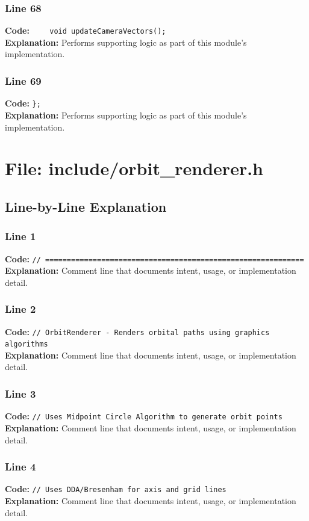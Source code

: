 \documentclass[11pt,a4paper]{article}
\begin{document}
\subsubsection*{Line 68}
\textbf{Code:} \verb|    void updateCameraVectors();|\\
\textbf{Explanation:} Performs supporting logic as part of this module's implementation.

\subsubsection*{Line 69}
\textbf{Code:} \verb|};|\\
\textbf{Explanation:} Performs supporting logic as part of this module's implementation.

\newpage
\section{File: include/orbit\_renderer.h}
\subsection{Line-by-Line Explanation}
\subsubsection*{Line 1}
\textbf{Code:} \verb|// ============================================================|\\
\textbf{Explanation:} Comment line that documents intent, usage, or implementation detail.

\subsubsection*{Line 2}
\textbf{Code:} \verb|// OrbitRenderer - Renders orbital paths using graphics algorithms|\\
\textbf{Explanation:} Comment line that documents intent, usage, or implementation detail.

\subsubsection*{Line 3}
\textbf{Code:} \verb|// Uses Midpoint Circle Algorithm to generate orbit points|\\
\textbf{Explanation:} Comment line that documents intent, usage, or implementation detail.

\subsubsection*{Line 4}
\textbf{Code:} \verb|// Uses DDA/Bresenham for axis and grid lines|\\
\textbf{Explanation:} Comment line that documents intent, usage, or implementation detail.
\end{document}
